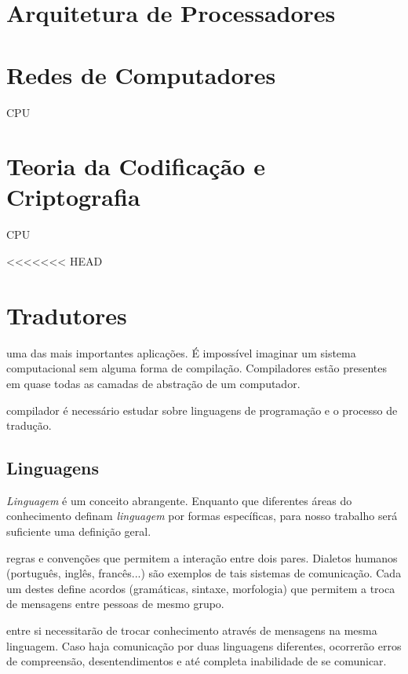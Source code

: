 \section{Arquitetura de Processadores}

\section{Redes de Computadores}

CPU

\section{Teoria da Codificação e Criptografia}

CPU

<<<<<<< HEAD
\section{Tradutores}

uma das mais importantes aplicações.  É impossível imaginar um sistema
computacional sem alguma forma de compilação. Compiladores estão presentes em
quase todas as camadas de abstração de um computador.

compilador é necessário estudar sobre linguagens de programação e o processo de
tradução.

\subsection{Linguagens}

\textit{Linguagem} é um conceito abrangente. Enquanto que diferentes áreas do
conhecimento definam \textit{linguagem} por formas específicas, para nosso
trabalho será suficiente uma definição geral.

regras e convenções que permitem a interação entre dois pares. Dialetos humanos
(português, inglês, francês...) são exemplos de tais sistemas de
comunicação. Cada um destes define acordos (gramáticas, sintaxe, morfologia) que
permitem a troca de mensagens entre pessoas de mesmo grupo.

entre si necessitarão de trocar conhecimento através de mensagens na mesma
linguagem. Caso haja comunicação por duas linguagens diferentes, ocorrerão erros
de compreensão, desentendimentos e até completa inabilidade de se comunicar.

